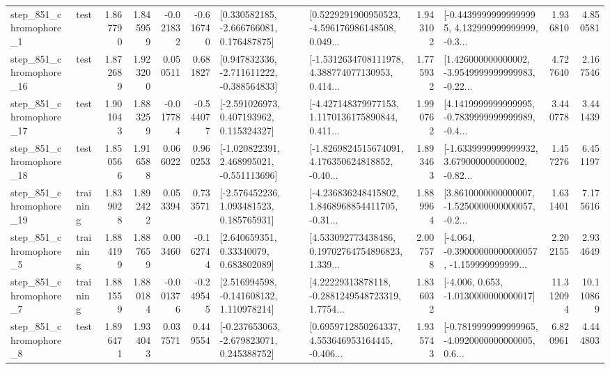 \begin{tabular}{llrrrrllrlrr}
   step\_851\_chromophore\_1 &      test &      1.867790 &    1.845959 &     -0.021832 & -0.616740 &    [0.330582185, -2.666766081, 0.176487875] &  [0.5229291900950523, -4.596176986148508, 0.049... &       1.943102 &  [-0.44399999999999995, 4.132999999999999, -0.3... &            1.936810 &          4.850581 \\
  step\_851\_chromophore\_16 &      test &      1.872689 &    1.923200 &      0.050511 &  0.681827 &   [0.947832336, -2.711611222, -0.388564833] &  [-1.5312634708111978, 4.388774077130953, 0.414... &       1.775932 &  [1.426000000000002, -3.9549999999999983, -0.22... &            4.727640 &          2.167546 \\
  step\_851\_chromophore\_17 &      test &      1.901043 &    1.883259 &     -0.017784 & -0.544077 &    [-2.591026973, 0.407193962, 0.115324327] &  [-4.427148379977153, 1.1170136175890844, 0.411... &       1.990762 &  [4.1419999999999995, -0.7839999999999989, -0.4... &            3.440778 &          3.441439 \\
  step\_851\_chromophore\_18 &      test &      1.850566 &    1.916588 &      0.066022 &  0.960253 &   [-1.020822391, 2.468995021, -0.551113696] &  [-1.8269824515674091, 4.176350624818852, -0.40... &       1.893463 &  [-1.6339999999999932, 3.679000000000002, -0.82... &            1.457276 &          6.451197 \\
  step\_851\_chromophore\_19 &  training &      1.839028 &    1.892422 &      0.053394 &  0.733571 &    [-2.576452236, 1.093481523, 0.185765931] &  [-4.236836248415802, 1.8468968854411705, -0.31... &       1.889964 &  [3.8610000000000007, -1.5250000000000057, -0.2... &            1.631401 &          7.175616 \\
   step\_851\_chromophore\_5 &  training &      1.884199 &    1.887659 &      0.003460 & -0.162744 &      [2.640659351, 0.33340079, 0.683802089] &  [4.533092773438486, 0.19702764754896823, 1.339... &       2.007578 &  [-4.064, -0.39000000000000057, -1.159999999999... &            2.202155 &          2.934649 \\
   step\_851\_chromophore\_7 &  training &      1.881559 &    1.880184 &     -0.001376 & -0.249545 &    [2.516994598, -0.141608132, 1.110978214] &  [4.22229313878118, -0.2881249548723319, 1.7754... &       1.836032 &               [-4.006, 0.653, -1.0130000000000017] &           11.312094 &         10.110869 \\
   step\_851\_chromophore\_8 &      test &      1.896471 &    1.934043 &      0.037571 &  0.449554 &   [-0.237653063, -2.679823071, 0.245388752] &  [0.6959712850264337, 4.553646953164445, -0.406... &       1.935743 &  [-0.7819999999999965, -4.0920000000000005, 0.6... &            6.820961 &          4.444803 \\

\end{tabular}
